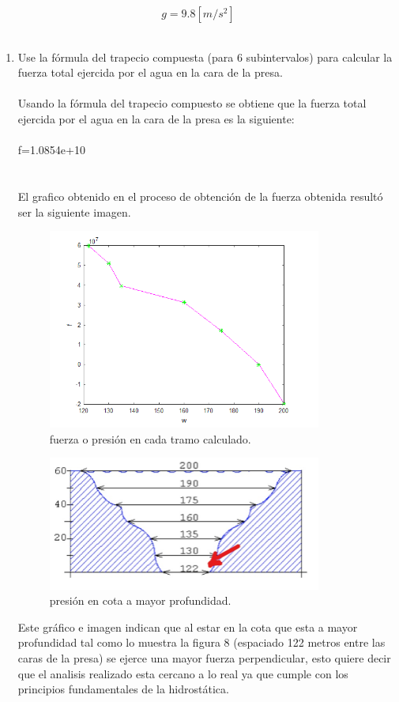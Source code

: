 \documentclass{udpreport}
\begin{document}
\begin{enumerate}
\begin{equation}
g=9.8[m/s^2]
\end{equation}
\\
 \begin{enumerate}
 \item Use la fórmula del trapecio compuesta (para 6 subintervalos) para calcular la fuerza total ejercida por el agua en la cara de la presa.
 \\ 
 \\
 Usando la fórmula del trapecio compuesto se obtiene que la fuerza total ejercida por el agua en la cara de la presa es la siguiente:
 \\
 \\
 f=1.0854e+10
 \\
 \\
 \\
 El grafico obtenido en el proceso de obtención de la fuerza obtenida resultó ser la siguiente imagen.
 \begin{figure}[H]
    \centering
    \includegraphics[width=9cm]{fuerza_trap}
    \caption{fuerza o presión en cada tramo calculado.} \label{fig:fuerza_trap}
\end{figure}
 \begin{figure}[H]
    \centering
    \includegraphics[width=9cm]{presionfin}
    \caption{presión en cota a mayor profundidad.} \label{fig:presionfin}
\end{figure}
Este gráfico e imagen indican que al estar en la cota que esta a mayor profundidad tal como lo muestra la figura 8 (espaciado 122 metros entre las caras de la presa) se ejerce una mayor fuerza perpendicular, esto quiere decir que el analisis realizado esta cercano a lo real ya que cumple con los principios fundamentales de la hidrostática. 
 \vspace{2.5cm}
 

\end{enumerate}
\end{enumerate}
\end{document}
